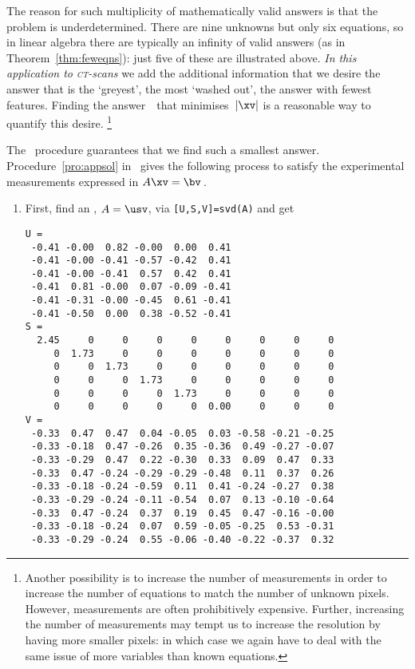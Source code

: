 \begin{example}
The reason for such multiplicity of mathematically valid answers is that the problem is underdetermined.  
There are nine unknowns but only six equations, so in linear algebra there are typically an infinity of valid answers (as in Theorem~\ref{thm:feweqns}): just five of these are illustrated above.
\emph{In this application to \textsc{ct}-scans} we add the additional information that we desire the answer that is the `greyest', the most `washed out', the answer with fewest features.
Finding the answer~\xv\ that minimises~\(|\xv|\) is a reasonable way to quantify this desire.
\footnote{Another possibility is to increase the number of measurements in order to increase the number of equations to match the number of unknown pixels.
However, measurements are often prohibitively expensive.
Further, increasing the number of measurements may tempt us to increase the resolution by having more smaller pixels: in which case we again have to deal with the same issue of more variables than known equations.}

The \svd\ procedure guarantees that we find such a smallest answer.
Procedure~\ref{pro:appsol} in \script\ gives the following process to satisfy the experimental measurements expressed in \(A\xv=\bv\)\,.
\begin{enumerate}
\item First, find an \svd, \(A=\usv\), via \verb|[U,S,V]=svd(A)| and get \twodp
\setbox\ajrqrbox\hbox{}%
\marginpar{\usebox{\ajrqrbox\\[2ex]}}%
\begin{small}
\begin{verbatim}
U =
 -0.41 -0.00  0.82 -0.00  0.00  0.41
 -0.41 -0.00 -0.41 -0.57 -0.42  0.41
 -0.41 -0.00 -0.41  0.57  0.42  0.41
 -0.41  0.81 -0.00  0.07 -0.09 -0.41
 -0.41 -0.31 -0.00 -0.45  0.61 -0.41
 -0.41 -0.50  0.00  0.38 -0.52 -0.41
S =
  2.45     0     0     0     0     0     0     0     0
     0  1.73     0     0     0     0     0     0     0
     0     0  1.73     0     0     0     0     0     0
     0     0     0  1.73     0     0     0     0     0
     0     0     0     0  1.73     0     0     0     0
     0     0     0     0     0  0.00     0     0     0
V =
 -0.33  0.47  0.47  0.04 -0.05  0.03 -0.58 -0.21 -0.25
 -0.33 -0.18  0.47 -0.26  0.35 -0.36  0.49 -0.27 -0.07
 -0.33 -0.29  0.47  0.22 -0.30  0.33  0.09  0.47  0.33
 -0.33  0.47 -0.24 -0.29 -0.29 -0.48  0.11  0.37  0.26
 -0.33 -0.18 -0.24 -0.59  0.11  0.41 -0.24 -0.27  0.38
 -0.33 -0.29 -0.24 -0.11 -0.54  0.07  0.13 -0.10 -0.64
 -0.33  0.47 -0.24  0.37  0.19  0.45  0.47 -0.16 -0.00
 -0.33 -0.18 -0.24  0.07  0.59 -0.05 -0.25  0.53 -0.31
 -0.33 -0.29 -0.24  0.55 -0.06 -0.40 -0.22 -0.37  0.32
\end{verbatim}
\end{small}



\end{enumerate}
\end{example}
